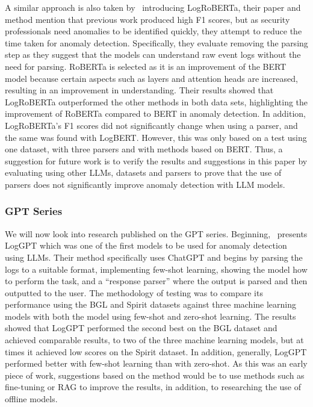 A similar approach is also taken by~\cite{sun4978351improving} introducing LogRoBERTa, their paper and method mention that previous work produced high F1 scores, but as security professionals need anomalies to be identified quickly, they attempt to reduce the time taken for anomaly detection. Specifically, they evaluate removing the parsing step as they suggest that the models can understand raw event logs without the need for parsing. RoBERTa is selected as it is an improvement of the BERT model because certain aspects such as layers and attention heads are increased, resulting in an improvement in understanding. Their results showed that LogRoBERTa outperformed the other methods in both data sets, highlighting the improvement of RoBERTa compared to BERT in anomaly detection. In addition, LogRoBERTa's F1 scores did not significantly change when using a parser, and the same was found with LogBERT. However, this was only based on a test using one dataset, with three parsers and with methods based on BERT. Thus, a suggestion for future work is to verify the results and suggestions in this paper by evaluating using other LLMs, datasets and parsers to prove that the use of parsers does not significantly improve anomaly detection with LLM models.

\subsubsection{GPT Series}
We will now look into research published on the GPT series. Beginning,~\cite{qi2023loggpt} presents LogGPT which was one of the first models to be used for anomaly detection using LLMs. Their method specifically uses ChatGPT and begins by parsing the logs to a suitable format, implementing few-shot learning, showing the model how to perform the task, and a ``response parser'' where the output is parsed and then outputted to the user. The methodology of testing was to compare its performance using the BGL and Spirit datasets against three machine learning models with both the model using few-shot and zero-shot learning. The results showed that LogGPT performed the second best on the BGL dataset and achieved comparable results, to two of the three machine learning models, but at times it achieved low scores on the Spirit dataset. In addition, generally, LogGPT performed better with few-shot learning than with zero-shot. As this was an early piece of work, suggestions based on the method would be to use methods such as fine-tuning or RAG to improve the results, in addition, to researching the use of offline models. 

